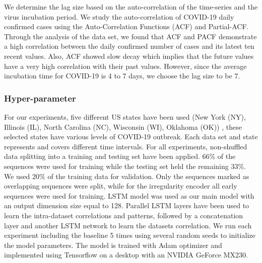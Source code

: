 \documentclass[conference]{IEEEtran}
\begin{document}
We determine the lag size based on the auto-correlation of the time-series and the virus incubation period. We study the auto-correlation of COVID-19 daily confirmed cases using the Auto-Correlation Functions (ACF) and Partial-ACF. Through the analysis of the data set, we found that ACF and PACF demonstrate a high correlation between the daily confirmed number of cases and its latest ten recent values. Also, ACF showed slow decay which implies that the future values have a very high correlation with their past values. However, since the average incubation time for COVID-19 is 4 to 7 days, we choose the lag size to be 7.


\subsubsection {Hyper-parameter}
For our experiments, five different US states have been used  (New York (NY), Illinois (IL), North Carolina (NC), Wisconsin (WI), Oklahoma (OK)) , these selected states have various levels of COVID-19 outbreak. Each data set and state represents and covers different time intervals.  For all experiments, non-shuffled data splitting into a training and testing set have been applied. 66\% of the sequences were used for training while the testing set held the remaining 33\%. We used 20\% of the training data for validation. Only the sequences marked as overlapping sequences were split, while for the irregularity encoder all early sequences were used for training. LSTM model was used as our main model with an output dimension size equal to 128. Parallel LSTM layers have been used to learn the intra-dataset correlations and patterns, followed by a concatenation layer and another LSTM network to learn the datasets correlation. We run each experiment including the baseline 5 times using several random seeds to initialize the model parameters. The model is trained with Adam optimizer and implemented using Tensorflow on a desktop with an NVIDIA GeForce MX230.
\end{document}
